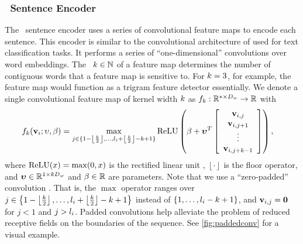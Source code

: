 \subsubsection{\ConvolutionalNeuralNetwork~Sentence Encoder} 

The \convolutionalneuralnetwork~sentence encoder uses a series of 
convolutional feature maps to encode each sentence. This encoder is similar
to the convolutional architecture of \citet{kim2014convolutional} used for 
text classification tasks. It performs a series of ``one-dimensional'' 
convolutions over word embeddings. The ~$k \in 
\mathbb{N}$ of a feature map determines the number of contiguous words that a 
feature map is sensitive to. For $k=3$, for example, the feature 
map would function as a trigram feature detector essentially. 
We denote a single convolutional feature map of kernel width 
$k$ as $f_k : \mathbb{R}^{*\times D_{w}} \rightarrow \mathbb{R}$ with
\begin{align}
    f_k(\mathbf{v}_i;\upsilon,\beta)  & 
= \max_{j \in \{ 
    1 - \left\lfloor \frac{k}{2} \right\rfloor, 
    \ldots, l_i +  
    \left\lfloor \frac{k}{2} \right\rfloor - k + 1 \}}
  \operatorname{ReLU}\left( \beta + \boldsymbol{\upsilon}^T \left[ \begin{array}{c} \mathbf{v}_{i,j}\\ \mathbf{v}_{i,j+1} \\ \vdots \\ \mathbf{v}_{i,j+k-1} \end{array} \right] \right),
\end{align}
where $\operatorname{ReLU}(x) = \max(0, x)$ is the rectified linear unit \citep{relu},
$\left\lfloor\cdot\right\rfloor$ is the floor operator,
and $\boldsymbol{\upsilon} \in \mathbb{R}^{1 \times k D_{w}}$
and $\beta \in \mathbb{R}$ are parameters. Note that we use a ``zero-padded'' 
convolution \cite{cnnarithmatic}. That is, the $\max$ operator ranges
over  $j \in \left\{1 - \left\lfloor \frac{k}{2} \right\rfloor, \ldots, 
    l_i +  \left\lfloor \frac{k}{2} \right\rfloor - k + 1
\right\}$ instead of $\left\{1,\ldots,l_i - k + 1\right\}$, and $\mathbf{v}_{i,j} = \mathbf{0}$ for
$j < 1$ and $j > l_i$. Padded convolutions help
alleviate the problem of reduced receptive fields on the boundaries 
of the sequence. See \autoref{fig:paddedconv} for a visual example.

